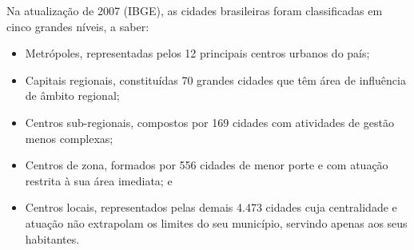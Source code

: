 {Na atualização de 2007 (IBGE), as cidades brasileiras foram classificadas em cinco grandes níveis, a saber:}


\begin{itemize}
\item Metrópoles, representadas pelos 12 principais centros urbanos do país;
\item Capitais regionais, constituídas 70 grandes cidades que têm área de influência
de âmbito regional;
\item Centros sub-regionais, compostos por 169 cidades com atividades de gestão menos complexas;
\item Centros de zona, formados por 556 cidades de menor porte e com atuação restrita à sua área imediata; e
\item Centros locais, representados pelas demais 4.473 cidades cuja centralidade e atuação não extrapolam os limites do seu município, servindo apenas aos seus habitantes.
\end{itemize}
	

